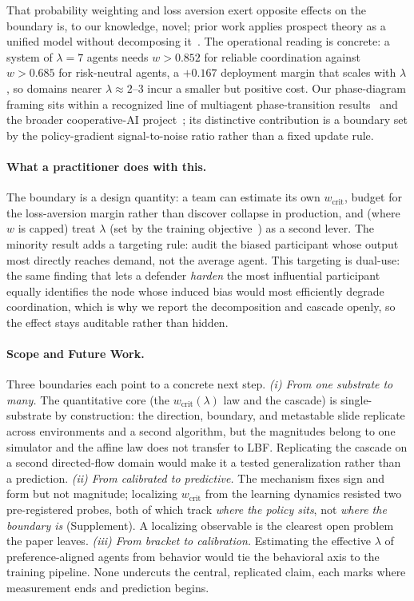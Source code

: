 \documentclass[letterpaper]{article} %
\theoremstyle{plain}
\newcommand{\wcrit}{w_{\mathrm{crit}}}
\begin{document}
That probability weighting and loss aversion exert opposite effects on the boundary is, to our
knowledge, novel; prior work applies prospect theory as a unified model without decomposing
it~\citep{lalmohammed2025,ghaemi2024risk}. The operational reading is concrete: a system of
$\lambda{=}7$ agents needs $w>0.852$ for reliable coordination against $w>0.685$ for risk-neutral
agents, a $+0.167$ deployment margin that scales with $\lambda$, so domains nearer
$\lambda\!\approx\!2$--$3$ incur a smaller but positive cost. Our phase-diagram framing sits within
a recognized line of multiagent phase-transition
results~\citep{yamaguchi2025,capannoli2026phase} and the broader cooperative-AI
project~\citep{dafoe2020open,hammond2025multiagent,barfuss2020caring}; its distinctive contribution
is a boundary set by the policy-gradient signal-to-noise ratio rather than a fixed update rule.

\paragraph{What a practitioner does with this.}
The boundary is a design quantity: a team can estimate its own $\wcrit$, budget for the
loss-aversion margin rather than discover collapse in production, and (where $w$ is capped) treat
$\lambda$ (set by the training objective~\citep{ethayarajh2024kto,rabin2000risk}) as a second lever.
The minority result adds a targeting rule: audit the biased participant whose output most directly
reaches demand, not the average agent. This targeting is dual-use: the same finding that lets a
defender \emph{harden} the most influential participant equally identifies the node whose induced
bias would most efficiently degrade coordination, which is why we report the decomposition and
cascade openly, so the effect stays auditable rather than hidden.

\paragraph{Scope and Future Work.}
Three boundaries each point to a concrete next step. \emph{(i) From one substrate to many.} The
quantitative core (the $\wcrit(\lambda)$ law and the cascade) is single-substrate by construction:
the direction, boundary, and metastable slide replicate across environments and a second algorithm,
but the magnitudes belong to one simulator and the affine law does not transfer to LBF. Replicating
the cascade on a second directed-flow domain would make it a tested generalization rather than a
prediction. \emph{(ii) From calibrated to predictive.} The mechanism fixes sign and form but not
magnitude; localizing $\wcrit$ from the learning dynamics resisted two pre-registered probes, both
of which track \emph{where the policy sits}, not \emph{where the boundary is} (Supplement). A
localizing observable is the clearest open problem the paper leaves. \emph{(iii) From bracket to
calibration.} Estimating the effective $\lambda$ of preference-aligned agents from behavior would
tie the behavioral axis to the training pipeline. None undercuts the central, replicated claim, each
marks where measurement ends and prediction begins.
\end{document}
